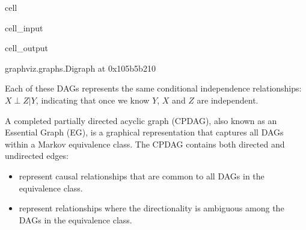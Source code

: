 \documentclass[letterpaper,10pt,english]{jupyterBook}
\begin{document}
\begin{sphinxuseclass}{cell}\begin{sphinxVerbatimInput}

\begin{sphinxuseclass}{cell_input}
\begin{sphinxVerbatim}[commandchars=\\\{\}]
  
 
 
\end{sphinxVerbatim}

\end{sphinxuseclass}\end{sphinxVerbatimInput}
\begin{sphinxVerbatimOutput}

\begin{sphinxuseclass}{cell_output}
\begin{sphinxVerbatim}[commandchars=\\\{\}]
\PYGZlt{}graphviz.graphs.Digraph at 0x105b5b210\PYGZgt{}
\end{sphinxVerbatim}

\end{sphinxuseclass}\end{sphinxVerbatimOutput}

\end{sphinxuseclass}
\sphinxAtStartPar
Each of these DAGs represents the same conditional independence relationships: \(X \perp Z | Y\), indicating that once we know \(Y\), \(X\) and \(Z\) are independent.

\sphinxAtStartPar
A completed partially directed acyclic graph (CPDAG), also known as an Essential Graph (EG), is a graphical representation that captures all DAGs within a Markov equivalence class. The CPDAG contains both directed and undirected edges:
\begin{itemize}
\item {} 
\sphinxAtStartPar
{} represent causal relationships that are common to all DAGs in the equivalence class.

\item {} 
\sphinxAtStartPar
{} represent relationships where the directionality is ambiguous among the DAGs in the equivalence class.

\end{itemize}
\end{document}
